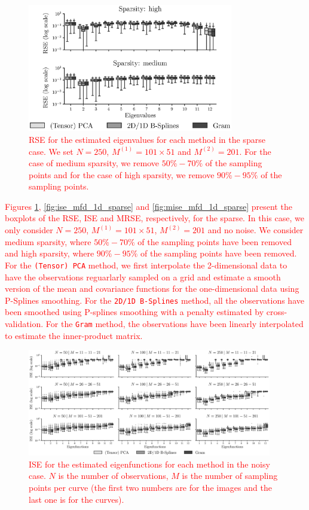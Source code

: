 \begin{figure}
    \centering
    \includegraphics[width=0.8\textwidth]{figures/AE_sparse.eps}
    \caption{\textcolor{red}{RSE for the estimated eigenvalues for each method in the sparse case. We set $N = 250$, $M^{(1)} = 101 \times 51$ and $M^{(2)} = 201$. For the case of medium sparsity, we remove $50\%-70\%$ of the sampling points and for the case of high sparsity, we remove $90\%-95\%$ of the sampling points.}}
    \label{fig:logAE_mfd_1d_sparse}
\end{figure}


\textcolor{red}{Figures \ref{fig:logAE_mfd_1d_sparse}, \ref{fig:ise_mfd_1d_sparse} and \ref{fig:mise_mfd_1d_sparse} present the boxplots of the RSE, ISE and MRSE, respectively, for the sparse. In this case, we only consider $N = 250$, $M^{(1)} = 101 \times 51$, $M^{(2)} = 201$ and no noise. We consider medium sparsity, where $50\%-70\%$ of the sampling points have been removed and high sparsity, where $90\%-95\%$ of the sampling points have been removed. For the \texttt{(Tensor) PCA} method, we first interpolate the 2-dimensional data to have the observations reguarlarly sampled on a grid and estimate a smooth version of the mean and covariance functions for the one-dimensional data using P-Splines smoothing. For the \texttt{2D/1D B-Splines} method, all the observations have been smoothed using P-splines smoothing with a penalty estimated by cross-validation. For the \texttt{Gram} method, the observations have been linearly interpolated to estimate the inner-product matrix.}



\begin{figure}
     \centering
    \includegraphics[width=0.95\textwidth]{figures/ISE_noise.eps}
    \caption{\textcolor{red}{ISE for the estimated eigenfunctions for each method in the noisy case. $N$ is the number of observations, $M$ is the number of sampling points per curve (the first two numbers are for the images and the last one is for the curves).}}
    \label{fig:ise_mfd_1d_noise}
\end{figure}

